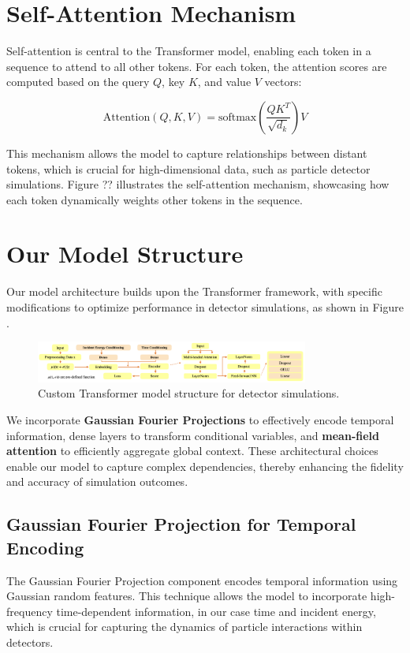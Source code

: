\section{Self-Attention Mechanism}
Self-attention is central to the Transformer model, enabling each token in a sequence to attend to all other tokens. For each token, the attention scores are computed based on the query \( Q \), key \( K \), and value \( V \) vectors:

\begin{equation}
\text{Attention}(Q, K, V) = \text{softmax} \left( \frac{QK^T}{\sqrt{d_k}} \right) V
\end{equation}

This mechanism allows the model to capture relationships between distant tokens, which is crucial for high-dimensional data, such as particle detector simulations. Figure ?? illustrates the self-attention mechanism, showcasing how each token dynamically weights other tokens in the sequence.

\section{Our Model Structure}
Our model architecture builds upon the Transformer framework, with specific modifications to optimize performance in detector simulations, as shown in Figure .

\begin{figure}[ht]
    \centering
    \includegraphics[width=0.8\textwidth]{Figures/model_structure.png}
    \caption{Custom Transformer model structure for detector simulations.}
    \label{fig:model_structure}

\end{figure}
We incorporate \textbf{Gaussian Fourier Projections} \cite{tancik_fourier_2020} to effectively encode temporal information, dense layers to transform conditional variables, and \textbf{mean-field attention} \cite{kach_pay_2024} to efficiently aggregate global context. These architectural choices enable our model to capture complex dependencies, thereby enhancing the fidelity and accuracy of simulation outcomes.

\subsection{Gaussian Fourier Projection for Temporal Encoding}
The Gaussian Fourier Projection component encodes temporal information using Gaussian random features. This technique allows the model to incorporate high-frequency time-dependent information, in our case time and incident energy, which is crucial for capturing the dynamics of particle interactions within detectors.

